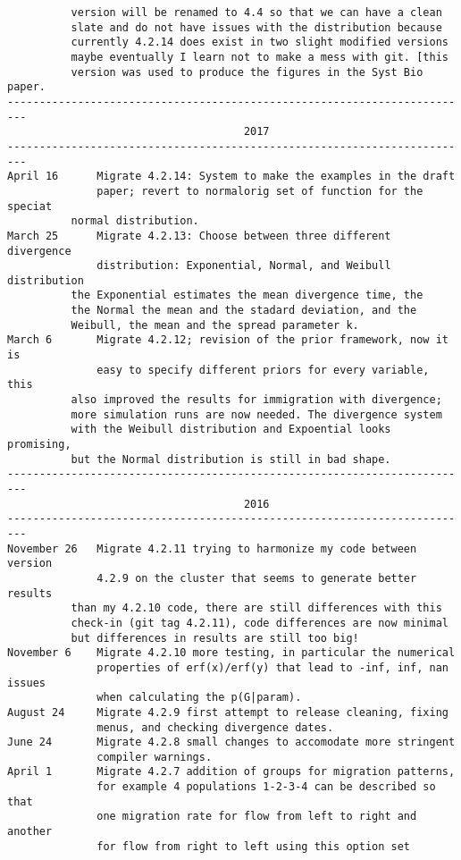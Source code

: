 \begin{small}
\begin{verbatim}
	      version will be renamed to 4.4 so that we can have a clean
	      slate and do not have issues with the distribution because
	      currently 4.2.14 does exist in two slight modified versions
	      maybe eventually I learn not to make a mess with git. [this
	      version was used to produce the figures in the Syst Bio paper.
-------------------------------------------------------------------------
                                     2017
-------------------------------------------------------------------------
April 16      Migrate 4.2.14: System to make the examples in the draft
              paper; revert to normalorig set of function for the speciat
	      normal distribution.
March 25      Migrate 4.2.13: Choose between three different divergence
              distribution: Exponential, Normal, and Weibull distribution
	      the Exponential estimates the mean divergence time, the
	      the Normal the mean and the stadard deviation, and the
	      Weibull, the mean and the spread parameter k.
March 6       Migrate 4.2.12; revision of the prior framework, now it is
              easy to specify different priors for every variable, this
	      also improved the results for immigration with divergence;
	      more simulation runs are now needed. The divergence system
	      with the Weibull distribution and Expoential looks promising,
	      but the Normal distribution is still in bad shape.
-------------------------------------------------------------------------
                                     2016
-------------------------------------------------------------------------
November 26   Migrate 4.2.11 trying to harmonize my code between version
              4.2.9 on the cluster that seems to generate better results
	      than my 4.2.10 code, there are still differences with this
	      check-in (git tag 4.2.11), code differences are now minimal
	      but differences in results are still too big!
November 6    Migrate 4.2.10 more testing, in particular the numerical 
              properties of erf(x)/erf(y) that lead to -inf, inf, nan issues
              when calculating the p(G|param). 
August 24     Migrate 4.2.9 first attempt to release cleaning, fixing 
              menus, and checking divergence dates.
June 24       Migrate 4.2.8 small changes to accomodate more stringent 
              compiler warnings.
April 1       Migrate 4.2.7 addition of groups for migration patterns,
              for example 4 populations 1-2-3-4 can be described so that
              one migration rate for flow from left to right and another
              for flow from right to left using this option set

\end{verbatim}
\end{small}
